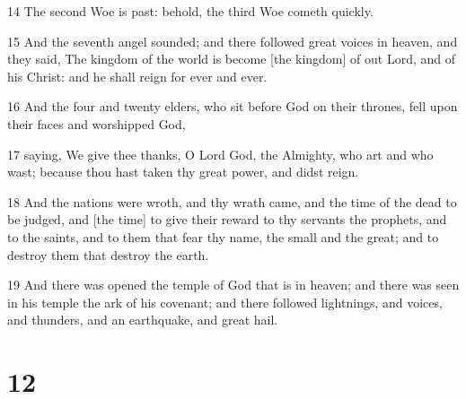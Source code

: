 \par 14 The second Woe is past: behold, the third Woe cometh quickly.
\par 15 And the seventh angel sounded; and there followed great voices in heaven, and they said, The kingdom of the world is become [the kingdom] of out Lord, and of his Christ: and he shall reign for ever and ever.
\par 16 And the four and twenty elders, who sit before God on their thrones, fell upon their faces and worshipped God,
\par 17 saying, We give thee thanks, O Lord God, the Almighty, who art and who wast; because thou hast taken thy great power, and didst reign.
\par 18 And the nations were wroth, and thy wrath came, and the time of the dead to be judged, and [the time] to give their reward to thy servants the prophets, and to the saints, and to them that fear thy name, the small and the great; and to destroy them that destroy the earth.
\par 19 And there was opened the temple of God that is in heaven; and there was seen in his temple the ark of his covenant; and there followed lightnings, and voices, and thunders, and an earthquake, and great hail.

\chapter{12}

